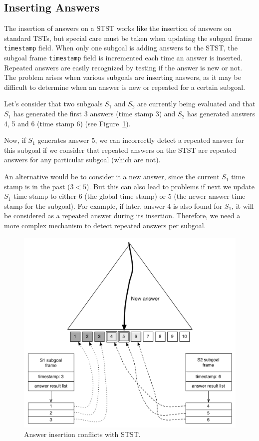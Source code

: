 \subsection{Inserting Answers}

The insertion of answers on a STST works like the insertion of answers on standard TSTs, but special care
must be taken when updating the subgoal frame \texttt{timestamp} field.
When only one subgoal is adding answers to the STST, the subgoal frame \texttt{timestamp} field
is incremented each time an answer is inserted. Repeated answers are easily recognized
by testing if the answer is new or not. The problem arises when various subgoals are inserting answers,
as it may be difficult to determine when an answer is new or repeated for a certain subgoal.

Let's consider that two subgoals $S_1$ and $S_2$ are currently being evaluated and that $S_1$ has generated the
first 3 answers (time stamp 3) and $S_2$ has generated answers 4, 5 and 6 (time stamp 6) (see
Figure~\ref{fig:stst_conflicts}).

Now, if $S_1$ generates answer 5, we can incorrectly detect a repeated answer
for this subgoal if we consider that repeated answers on the STST are repeated answers for any
particular subgoal (which are not).

An alternative would be to consider it a new answer, since the current $S_1$ time stamp
is in the past ($3 < 5$). But this can also lead to problems if next we update $S_1$ time stamp
to either 6 (the global time stamp) or 5 (the newer answer time stamp for the subgoal).
For example, if later, answer 4 is also found for $S_1$, it will be considered as a repeated answer
during its insertion. Therefore, we need a more complex mechanism to
detect repeated answers per subgoal.

\begin{figure}[ht]
  \centering
    \includegraphics[scale=0.5]{stst_conflicts.pdf}
  \caption{Answer insertion conflicts with STST.}
  \label{fig:stst_conflicts}
\end{figure}


